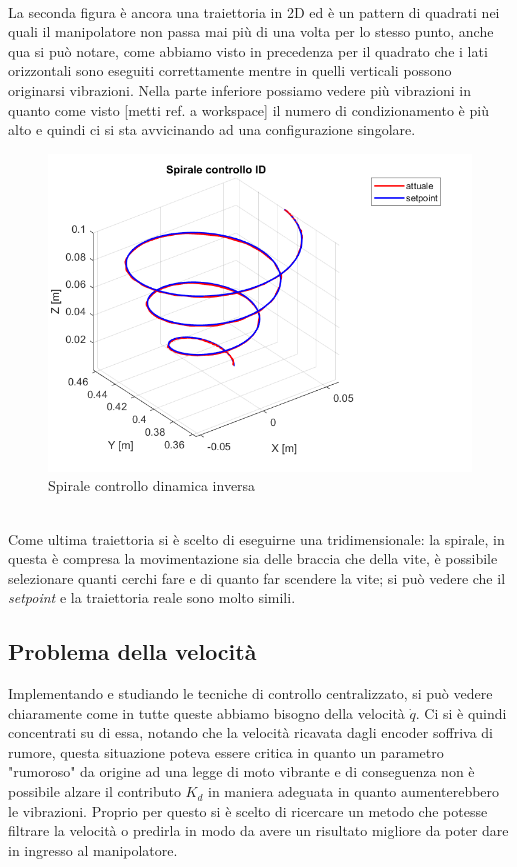 \\La seconda figura è ancora una traiettoria in 2D ed è un pattern di quadrati nei quali il manipolatore non passa mai più di una volta per lo stesso punto, anche qua si può notare, come abbiamo visto in precedenza per il quadrato che i lati orizzontali sono eseguiti correttamente mentre in quelli verticali possono originarsi vibrazioni. Nella parte inferiore possiamo vedere più vibrazioni in quanto come visto [metti ref. a workspace] il numero di condizionamento è più alto e quindi ci si sta avvicinando ad una configurazione singolare.
\begin{figure}[ht]
	\begin{center}
		\includegraphics[scale=0.5]{Immagini/Traiettorie/SpiraleID}
		\caption{Spirale controllo dinamica inversa}
		\label{fig:SpiraleID}
	\end{center}
\end{figure}
\\Come ultima traiettoria si è scelto di eseguirne una tridimensionale: la spirale, in questa è compresa la movimentazione sia delle braccia che della vite, è possibile selezionare quanti cerchi fare e di quanto far scendere la vite; si può vedere che il \textit{setpoint} e la traiettoria reale sono molto simili.
\subsection{Problema della velocità}
Implementando e studiando le tecniche di controllo centralizzato, si può vedere chiaramente come in tutte queste abbiamo bisogno della velocità $\dot{q}$. Ci si è quindi concentrati su di essa, notando che la velocità ricavata dagli encoder soffriva di rumore, questa situazione poteva essere critica in quanto un parametro "rumoroso" da origine ad una legge di moto vibrante e di conseguenza non è possibile alzare il contributo $K_d$ in maniera adeguata in quanto aumenterebbero le vibrazioni. Proprio per questo si è scelto di ricercare un metodo che potesse filtrare la velocità o predirla in modo da avere un risultato migliore da poter dare in ingresso al manipolatore.
